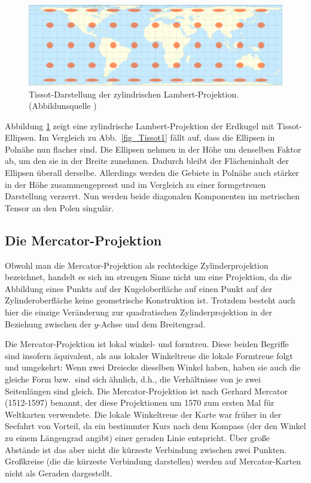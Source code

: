 \begin{figure}[htb]
\includegraphics[scale=0.49]{./Bilder/Lambert.png}
\caption{\label{fig_Lambert}%
Tissot-Darstellung der zylindrischen Lambert-Projektion. (Abbildunsquelle \cite{WikiLambert})}
\end{figure}

Abbildung \ref{fig_Lambert} zeigt eine zylindrische Lambert-Projektion der Erdkugel mit 
Tissot-Ellipsen.
Im Vergleich zu Abb.\ \ref{fig_Tissot1} f\"allt auf, dass die Ellipsen in Poln\"ahe nun flacher sind.
Die Ellipsen nehmen in der H\"ohe um denselben Faktor ab, um den sie in der Breite zunehmen.
Dadurch bleibt der Fl\"acheninhalt der Ellipsen \"uberall derselbe. Allerdings werden die Gebiete in
Poln\"ahe auch st\"arker in der H\"ohe zusammengepresst und im Vergleich zu einer formgetreuen
Darstellung verzerrt. Nun werden beide diagonalen Komponenten im metrischen Tensor an den Polen
singul\"ar.

\subsection{Die Mercator-Projektion}  
\label{sec_Mercator}

Obwohl man die Mercator-Projektion 
als rechteckige Zylinderprojektion bezeichnet, handelt es sich
im strengen Sinne nicht um eine Projektion, da die Abbildung eines Punkts auf der Kugeloberfl\"ache
auf einen Punkt auf der Zylinderoberfl\"ache keine geometrische Konstruktion ist. Trotzdem besteht auch hier
die einzige Ver\"anderung zur quadratischen Zylinderprojektion in der Beziehung zwischen der
$y$-Achse und dem Breitengrad. 

Die Mercator-Projektion ist lokal winkel- und formtreu. Diese beiden Begriffe sind insofern
\"aquivalent, als aus lokaler Winkeltreue die lokale Formtreue folgt und umgekehrt: Wenn zwei
Dreiecke dieselben Winkel haben, haben sie auch die gleiche Form bzw.\ sind sich \"ahnlich, d.h., die 
Verh\"altnisse von je zwei Seitenl\"angen sind gleich. Die Mercator-Projektion ist nach Gerhard Mercator
(1512-1597) 
benannt, der diese Projektionen um 1570 zum ersten Mal f\"ur Weltkarten verwendete.
Die lokale Winkeltreue der Karte war fr\"uher in der Seefahrt von Vorteil, da ein bestimmter Kurs nach
dem Kompass (der den Winkel zu einem L\"angengrad angibt) einer geraden Linie entspricht. 
\"Uber gro\ss e Abst\"ande ist das aber nicht die k\"urzeste Verbindung zwischen zwei Punkten.
Gro\ss kreise (die die k\"urzeste Verbindung darstellen) werden auf Mercator-Karten nicht als
Geraden dargestellt. 

